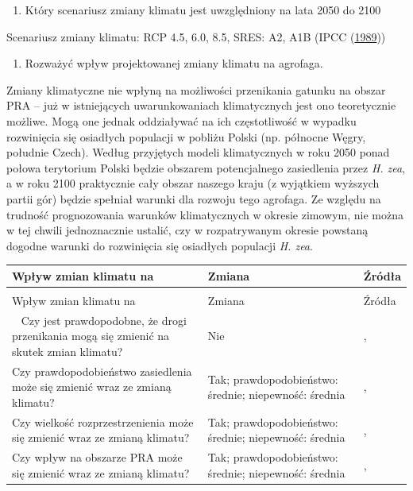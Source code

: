 \documentclass[polish,a4paper]{article}
\providecommand{\tightlist}{%
  \setlength{\itemsep}{0pt}\setlength{\parskip}{0pt}}
\begin{document}
\begin{enumerate}
\def\labelenumi{\Roman{enumi})}
\tightlist
\item
  Który scenariusz zmiany klimatu jest uwzględniony na lata 2050 do 2100
\end{enumerate}

Scenariusz zmiany klimatu: RCP 4.5, 6.0, 8.5, SRES: A2, A1B (IPCC
(\protect\hyperlink{ref-ipcc2014}{1989}))

\begin{enumerate}
\def\labelenumi{\Roman{enumi})}
\setcounter{enumi}{1}
\tightlist
\item
  Rozważyć wpływ projektowanej zmiany klimatu na agrofaga.
\end{enumerate}

Zmiany klimatyczne nie wpłyną na możliwości przenikania gatunku na
obszar PRA -- już w istniejących uwarunkowaniach klimatycznych jest ono
teoretycznie możliwe. Mogą one jednak oddziaływać na ich częstotliwość w
wypadku rozwinięcia się osiadłych populacji w pobliżu Polski (np.
północne Węgry, południe Czech). Według przyjętych modeli klimatycznych
w roku 2050 ponad połowa terytorium Polski będzie obszarem potencjalnego
zasiedlenia przez \emph{H. zea}, a w roku 2100 praktycznie cały obszar
naszego kraju (z wyjątkiem wyższych partii gór) będzie spełniał warunki
dla rozwoju tego agrofaga. Ze względu na trudność prognozowania warunków
klimatycznych w okresie zimowym, nie można w tej chwili jednoznacznie
ustalić, czy w rozpatrywanym okresie powstaną dogodne warunki do
rozwinięcia się osiadłych populacji \emph{H. zea}.

\begin{longtabu} to 
\toprule
{}  \textbf{Wpływ zmian klimatu na} & \textbf{Zmiana} & \textbf{Źródła}\\
\midrule
\endfirsthead
{}\\
\toprule
Wpływ zmian klimatu na & Zmiana & Źródła\\
\midrule
\endhead
\
\endfoot
\bottomrule
\endlastfoot
Czy jest prawdopodobne, że drogi przenikania mogą się zmienić na skutek zmian klimatu? & Nie & \citeauthor{eppo2018}, \hyperlink{ref-eppo2018}{\citeyear{eppo2018}}\\
Czy prawdopodobieństwo zasiedlenia może się zmienić wraz ze zmianą klimatu? & Tak; prawdopodobieństwo: średnie; niepewność: średnia & \citeauthor{kogan1989}, \hyperlink{ref-kogan1989}{\citeyear{kogan1989}}\\
Czy wielkość rozprzestrzenienia może się zmienić wraz ze zmianą klimatu? & Tak; prawdopodobieństwo: średnie; niepewność: średnia & \citeauthor{eppo2018}, \hyperlink{ref-eppo2018}{\citeyear{eppo2018}}\\
Czy wpływ na obszarze PRA może się zmienić wraz ze zmianą klimatu? & Tak; prawdopodobieństwo: średnie; niepewność: średnia & \citeauthor{eppo2018}, \hyperlink{ref-eppo2018}{\citeyear{eppo2018}}\\*
\end{longtabu}
\end{document}
